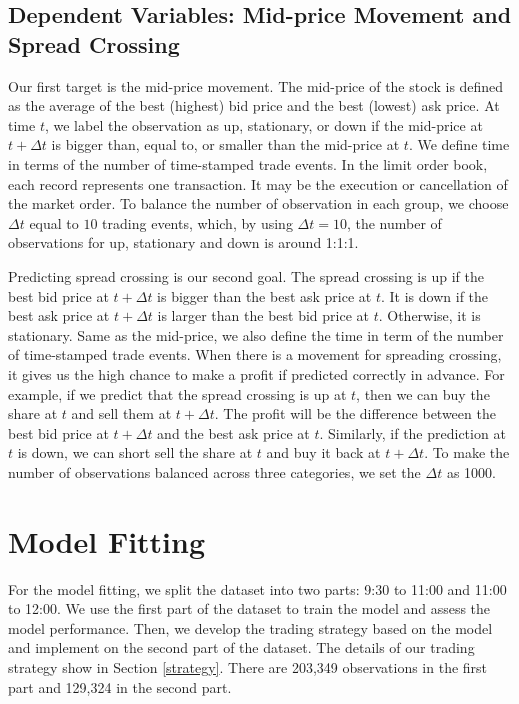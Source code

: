 \documentclass[11pt]{article}
\begin{document}
\subsection{Dependent Variables: Mid-price Movement and Spread Crossing}
Our first target is the mid-price movement. The mid-price of the stock is defined as the average of the best (highest) bid price and the best (lowest) ask price. At time $t$, we label the observation as up, stationary, or down if the mid-price at $t + \Delta t$ is bigger than, equal to, or smaller than the mid-price at $t$. We define time in terms of the number of time-stamped trade events. In the limit order book, each record represents one transaction. It may be the execution or cancellation of the market order. To balance the number of observation in each group, we choose $\Delta t$ equal to $10$ trading events, which, by using $\Delta t = 10$, the number of observations for up, stationary and down is around 1:1:1. 

Predicting spread crossing is our second goal. The spread crossing is up if the best bid price at $t + \Delta t$ is bigger than the best ask price at $t$. It is down if the best ask price at $t + \Delta t$ is larger than the best bid price at $t$. Otherwise, it is stationary. Same as the mid-price, we also define the time in term of the number of time-stamped trade events. When there is a movement for spreading crossing, it gives us the high chance to make a profit if predicted correctly in advance. For example, if we predict that the spread crossing is up at $t$, then we can buy the share at $t$ and sell them at $t + \Delta t$. The profit will be the difference between the best bid price at $t + \Delta t$ and the best ask price at $t$. Similarly, if the prediction at $t$ is down, we can short sell the share at $t$ and buy it back at $t + \Delta t$. To make the number of observations balanced across three categories, we set the $\Delta t$ as 1000.



\section{Model Fitting} \label{modelfitting}


For the model fitting, we split the dataset into two parts: 9:30 to 11:00 and 11:00 to 12:00. We use the first part of the dataset to train the model and assess the model performance. Then, we develop the trading strategy based on the model and implement on the second part of the dataset. The details of our trading strategy show in Section \ref{strategy}. There are 203,349 observations in the first part and 129,324 in the second part. 
\end{document}
